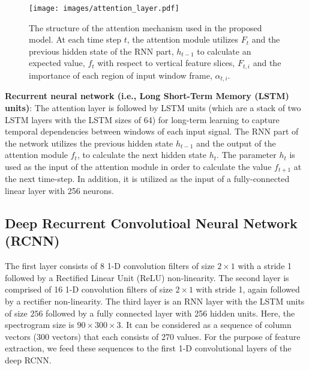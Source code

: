 \documentclass[conference]{IEEEtran}
\begin{document}
\begin{figure}[htb]
\centering
\texttt{[image: images/attention\_layer.pdf]}
  \caption{The structure of the attention mechanism used in the proposed model. At each time step $t$, the attention module utilizes $F_t$ and the previous hidden state of the RNN part, $h_{t-1}$ to calculate an expected value, $f_t$  with respect to  vertical feature slices, $F_{t,i}$ and the importance of each region of input window frame, $\alpha_{t,i}$.}
  \label{fig:attention_layer}

\end{figure}  

  
\noindent\textbf{Recurrent neural network (i.e., Long Short-Term Memory (LSTM) units)}:  The attention layer is followed by LSTM units (which are a stack of two LSTM layers with the LSTM sizes of 64) for long-term learning to capture temporal dependencies between windows of each input signal. The RNN part of the network utilizes the previous hidden state $h_{t-1}$ and the output of the attention module $f_t$, to calculate the next hidden state $h_{t}$.  The parameter $h_{t}$ is used as the input of the attention module in order to calculate the value $f_{t+1}$ at the next time-step. In addition, it is utilized as the input of a fully-connected linear layer with 256 neurons. 



\subsection*{Deep Recurrent Convolutioal Neural Network (RCNN)}


The first layer consists of $8$ 1-D convolution filters of size $2 \times 1$ with a stride 1 followed by a Rectified Linear Unit (ReLU) non-linearity. The second layer is comprised of 16 1-D convolution filters of size $2\times1$ with stride 1, again followed by a rectifier non-linearity. The third layer is an RNN layer with the LSTM units of size $256$ followed by a fully connected layer with 256 hidden units. Here, the spectrogram size is $90\times 300 \times3$. It can be considered as a sequence of column vectors (300 vectors) that each consists of 270 values. For the purpose of feature extraction, we feed these sequences to the first 1-D convolutional layers of the deep RCNN. 
\end{document}
